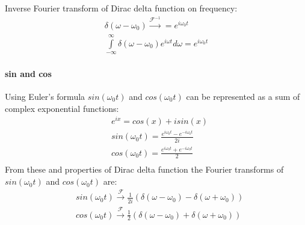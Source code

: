 \documentclass{article}
\begin{document}


Inverse Fourier transform of Dirac delta function on frequency:
\begin{align*}
    \delta(\omega-\omega_0) \xrightarrow{\mathcal{F}^{-1}} = e^{i \omega_0 t}\\
    \int \limits^{\infty}_{-\infty} \delta(\omega-\omega_0) e^{i \omega t} d\omega = e^{i \omega_0 t}
\end{align*}



\paragraph{sin and cos}
Using Euler's formula $sin(\omega_0 t)$ and $cos(\omega_0 t)$ can be represented as a sum of complex exponential functions:
\begin{align*}
    &e^{ix} = cos(x) + i sin(x)\\
    &sin(\omega_0 t) = \frac{e^{i \omega_0 t} - e^{-i \omega_0 t}}{2i} \\
    &cos(\omega_0 t) = \frac{e^{i \omega_0 t} + e^{-i \omega_0 t}}{2} \\
\end{align*}
From these and properties of Dirac delta function the Fourier transforms of $sin(\omega_0 t)$ and $cos(\omega_0 t)$ are:
\begin{align*}
    &sin(\omega_0 t) \xrightarrow{\mathcal{F}} \frac{1}{2i} \left( \delta(\omega - \omega_0) - \delta(\omega + \omega_0) \right) \\
    &cos(\omega_0 t) \xrightarrow{\mathcal{F}} \frac{1}{2}  \left( \delta(\omega - \omega_0) + \delta(\omega + \omega_0) \right)\\
\end{align*}
\end{document}
